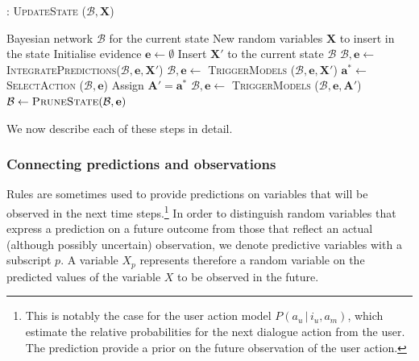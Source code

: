 \begin{algorithm}[h]
\caption{: \textsc{UpdateState} ($\mathcal{B}, \mathbf{X}$)}
\begin{algorithmic}[1] \vspace{1mm}
\REQUIRE Bayesian network $\mathcal{B}$ for the current state
\REQUIRE New random variables $\mathbf{X}$ to insert in the state \vspace{1mm}
\STATE Initialise evidence $\mathbf{e} \leftarrow \emptyset$
\STATE Insert $\mathbf{X}'$ to the current state $\mathcal{B}$ 
\STATE $\mathcal{B}, \mathbf{e} \leftarrow $ \textsc{IntegratePredictions}($\mathcal{B}, \mathbf{e}, \mathbf{X}'$)
\STATE $\mathcal{B}, \mathbf{e} \leftarrow$ \textsc{TriggerModels} ($\mathcal{B}, \mathbf{e},  \mathbf{X}'$) \vspace{1mm}
\STATE $\mathbf{a}^* \leftarrow $ \textsc{SelectAction} ($\mathcal{B}, \mathbf{e}$)
\STATE Assign $\mathbf{A}' = \mathbf{a}^*$
\STATE $\mathcal{B}, \mathbf{e} \leftarrow$ \textsc{TriggerModels} ($\mathcal{B}, \mathbf{e}, \mathbf{A}'$)
\ENDWHILE \vspace{1mm}
\STATE $\mathcal{B} \leftarrow \textsc{PruneState} (\mathcal{B}, \mathbf{e})$ \vspace{1mm}
\end{algorithmic}
\label{algo:stateupdate}
\end{algorithm}

We now describe each of these steps in detail.


\subsubsection*{Connecting predictions and observations}

Rules are sometimes used to provide predictions on variables that will be observed in the next time steps.\footnote{This is notably the case for the user action model $P(a_u \, | \, i_u, a_m)$, which estimate the relative probabilities for the next dialogue action from the user. The prediction provide a prior on the future observation of the user action.} In order to distinguish random variables that express a prediction on a future outcome from those that reflect an actual (although possibly uncertain) observation, we denote predictive variables with a subscript $p$. A variable $X_p$ represents therefore a random variable on the predicted values of the variable $X$ to be observed in the future. 


